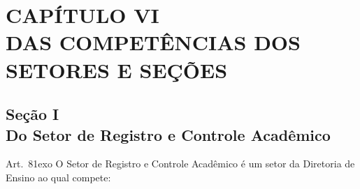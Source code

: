 \documentclass[a4paper,12pt]{report}
\newcommand{\ORD}[2]{#1\raise1ex\hbox{\scriptsize#2}}
\begin{document}

\section{CAPÍTULO VI \\ DAS COMPETÊNCIAS DOS SETORES E SEÇÕES}
 

\subsection{Seção I \\ Do Setor de Registro e Controle Acadêmico}

Art.~\ORD{8}{o} O Setor de Registro e Controle Acadêmico é um setor da Diretoria de Ensino ao qual compete:
\end{document}
